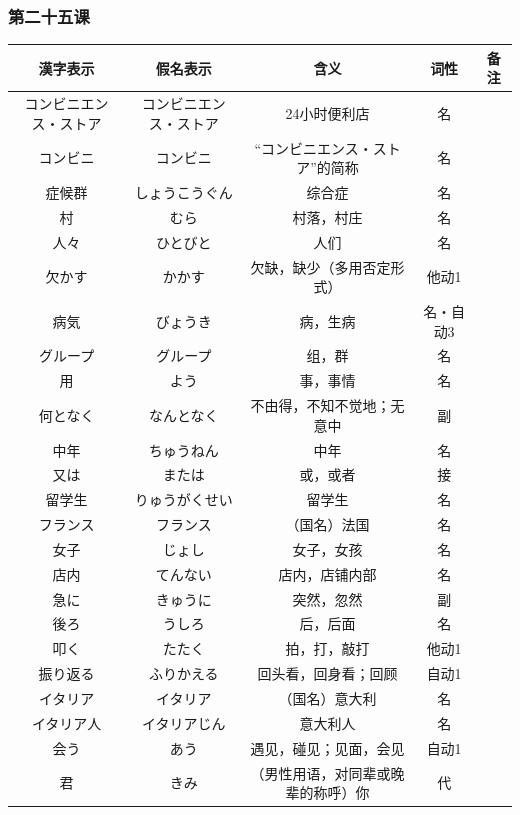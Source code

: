 \subsubsection{第二十五课}
\begin{longtable}{|c|c|c|c|c|}
    \hline
漢字表示 & 假名表示  & 含义 & 词性 & 备注 \\ \hline\hline
コンビニエンス・ストア & コンビニエンス・ストア & 24小时便利店 & 名 &  \\ \hline
コンビニ & コンビニ & “コンビニエンス・ストア”的简称 & 名 &  \\ \hline
症候群 & しょうこうぐん & 综合症 & 名 &  \\ \hline
村 & むら & 村落，村庄 & 名 &  \\ \hline
人々 & ひとびと & 人们 & 名 &  \\ \hline
欠かす & かかす & 欠缺，缺少（多用否定形式） & 他动1 &  \\ \hline
病気 & びょうき & 病，生病 & 名・自动3 &  \\ \hline
グループ & グループ & 组，群 & 名 &  \\ \hline
用 & よう & 事，事情 & 名 &  \\ \hline
何となく & なんとなく & 不由得，不知不觉地；无意中 & 副 &  \\ \hline
中年 & ちゅうねん & 中年 & 名 &  \\ \hline
又は & または & 或，或者 & 接 &  \\ \hline
留学生 & りゅうがくせい & 留学生 & 名 &  \\ \hline
フランス & フランス & （国名）法国 & 名 &  \\ \hline
女子 & じょし & 女子，女孩 & 名 &  \\ \hline
店内 & てんない & 店内，店铺内部 & 名 &  \\ \hline
急に & きゅうに & 突然，忽然 & 副 &  \\ \hline
後ろ & うしろ & 后，后面 & 名 &  \\ \hline
叩く & たたく & 拍，打，敲打 & 他动1 &  \\ \hline
振り返る & ふりかえる & 回头看，回身看；回顾 & 自动1 &  \\ \hline
イタリア & イタリア & （国名）意大利 & 名 &  \\ \hline
イタリア人 & イタリアじん & 意大利人 & 名 &  \\ \hline
会う & あう & 遇见，碰见；见面，会见 & 自动1 &  \\ \hline
君 & きみ & （男性用语，对同辈或晚辈的称呼）你 & 代 &  \\ \hline

\end{longtable}
